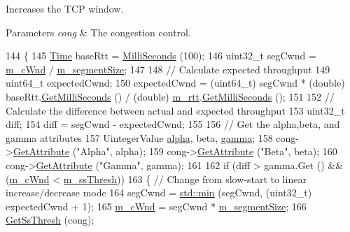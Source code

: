 Increases the T\+CP window. 


\begin{DoxyParams}{Parameters}
{\em cong} & The congestion control. \\
\hline
\end{DoxyParams}

\begin{DoxyCode}
144 \{
145   \hyperlink{classns3_1_1Time}{Time} baseRtt = \hyperlink{group__timecivil_gaf26127cf4571146b83a92ee18679c7a9}{MilliSeconds} (100);
146   uint32\_t segCwnd = \hyperlink{classTcpVegasTest_a60f99e3ccb08c3ebfd7e7de6896ec2be}{m\_cWnd} / \hyperlink{classTcpVegasTest_a93c5780c0af6cdfa7af29c0a5688ca0a}{m\_segmentSize};
147 
148   \textcolor{comment}{// Calculate expected throughput}
149   uint64\_t expectedCwnd;
150   expectedCwnd = (uint64\_t) segCwnd * (\textcolor{keywordtype}{double}) baseRtt.\hyperlink{classns3_1_1Time_aba3428a8b6c4c8d9014ce44145081f34}{GetMilliSeconds} () / (double) 
      \hyperlink{classTcpVegasTest_aea88a087919c8ad57ea580fb684996b4}{m\_rtt}.\hyperlink{classns3_1_1Time_aba3428a8b6c4c8d9014ce44145081f34}{GetMilliSeconds} ();
151 
152   \textcolor{comment}{// Calculate the difference between actual and expected throughput}
153   uint32\_t diff;
154   diff = segCwnd - expectedCwnd;
155 
156   \textcolor{comment}{// Get the alpha,beta, and gamma attributes}
157   UintegerValue \hyperlink{lte__uplink__power__control_8m_a62197192f0fbf4e0675eb37be1c4c175}{alpha}, beta, \hyperlink{lte__amc_8m_a8d00631c9622112f1877fdb1222c242e}{gamma};
158   cong->\hyperlink{classns3_1_1ObjectBase_a895d1de2f96063d0e0fd78463e7a7e30}{GetAttribute} (\textcolor{stringliteral}{"Alpha"}, alpha);
159   cong->\hyperlink{classns3_1_1ObjectBase_a895d1de2f96063d0e0fd78463e7a7e30}{GetAttribute} (\textcolor{stringliteral}{"Beta"}, beta);
160   cong->\hyperlink{classns3_1_1ObjectBase_a895d1de2f96063d0e0fd78463e7a7e30}{GetAttribute} (\textcolor{stringliteral}{"Gamma"}, gamma);
161 
162   \textcolor{keywordflow}{if} (diff > gamma.Get () && (\hyperlink{classTcpVegasTest_a60f99e3ccb08c3ebfd7e7de6896ec2be}{m\_cWnd} < \hyperlink{classTcpVegasTest_afee1db7a63768ef7cbf6641f2235c263}{m\_ssThresh}))
163     \{ \textcolor{comment}{// Change from slow-start to linear increase/decrease mode}
164       segCwnd = \hyperlink{80211b_8c_ac6afabdc09a49a433ee19d8a9486056d}{std::min} (segCwnd, (uint32\_t) expectedCwnd + 1);
165       \hyperlink{classTcpVegasTest_a60f99e3ccb08c3ebfd7e7de6896ec2be}{m\_cWnd} = segCwnd * \hyperlink{classTcpVegasTest_a93c5780c0af6cdfa7af29c0a5688ca0a}{m\_segmentSize};
166       \hyperlink{classTcpVegasTest_a569cf1bac86619b1d7f458b790a48d93}{GetSsThresh} (cong);

\end{DoxyCode}
